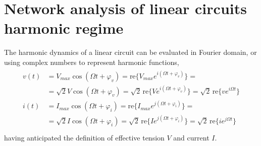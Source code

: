 \documentclass[letterpaper,10pt,english]{jupyterBook}
\begin{document}
\section{Network analysis of linear circuits \sphinxhyphen{} harmonic regime}
\label{\detokenize{ch/electrical-engineering-networks-harmonic:network-analysis-of-linear-circuits-harmonic-regime}}\label{\detokenize{ch/electrical-engineering-networks-harmonic:classical-electromagnetism-electrical-engineering-newtork-analysis-harmonic}}\label{\detokenize{ch/electrical-engineering-networks-harmonic::doc}}
\sphinxAtStartPar
The harmonic dynamics of a linear circuit can be evaluated in Fourier domain, or using complex numbers to represent harmonic functions,
\begin{equation*}
\begin{split}\begin{aligned}
  v(t) & = V_{max} \cos (\Omega t + \varphi_v) = \text{re} \{ V_{max} e^{i (\Omega t + \varphi_v)} \} = \\
       & = \sqrt{2} V \cos (\Omega t + \varphi_v) = \sqrt{2} \, \text{re} \{ V e^{i (\Omega t + \varphi_v)} \} = \sqrt{2} \, \text{re} \{ v e^{i \Omega t} \} \\
  i(t) & = I_{max} \cos (\Omega t + \varphi_i) = \text{re} \{ I_{max} e^{j (\Omega t + \varphi_i)} \} = \\
       & = \sqrt{2} I \cos (\Omega t + \varphi_i) = \sqrt{2} \, \text{re} \{ I e^{j (\Omega t + \varphi_i)} \} = \sqrt{2} \, \text{re} \{ i e^{j \Omega t} \} \\
\end{aligned}\end{split}
\end{equation*}
\sphinxAtStartPar
having anticipated the definition {\hyperref[\detokenize{ch/electrical-engineering-networks-harmonic:harmonic:effective-values}]{}} of effective tension \(V\) and current \(I\).
\end{document}
